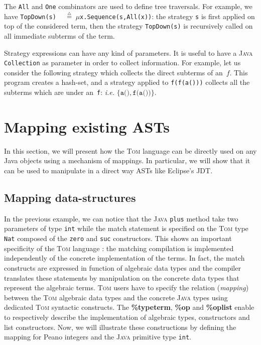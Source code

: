 \documentclass[runningheads]{llncs}
\newcommand{\tom}{\textsc{Tom}}
\newcommand{\java}{\textsc{Java}}
\newcommand{\lex}[1]{{\textrm{\textbf{#1}}}}
\newcommand{\isdef}{\mathrel{\mbox{\small$\stackrel{\mbox{\tiny$\triangle$}}{=}$}}}
\newcommand{\Mu}{{\ensuremath{\mu}}}
\newcommand{\ie}{\textit{i.e.}}
\begin{document}
The \texttt{All} and \texttt{One} combinators are used to define tree
traversals. For example, we have
\texttt{TopDown(s)}~${\isdef}$~$\Mu$\texttt{x.Sequence(s,All(x))}:
the strategy
 \texttt{s} is first applied on top of the considered term, then
the strategy \texttt{TopDown(s)} is recursively called on all immediate
subterms of the term.

Strategy expressions can have any kind of parameters. It is useful to have a
{\java} \texttt{Collection} as parameter in order to collect information.  For
example, let us consider the following strategy which collects the direct
subterms of an~$f$.  This program creates a hash-set, and a strategy applied to
\texttt{f(f(a()))} collects all the subterms which are under an~\texttt{f}:
{\ie} $\{\texttt{a()}, \texttt{f(a())}\}$.


\section{Mapping existing ASTs}

In this section, we will present how the {\tom} language can be directly used
on any Java objects using a mechanism of mappings. In particular, we will show
that it can be used to manipulate in a direct way ASTs like Eclipse's JDT.


\subsection{Mapping data-structures}

In the previous example, we can notice that the {\java} \texttt{plus} method
take two parameters of type \texttt{int} while the match statement is specified
on the {\tom} type \texttt{Nat} composed of the \texttt{zero} and \texttt{suc}
constructors. This shows an important specificity of the {\tom} language : the
matching compilation is implemented independently of the concrete
implementation of the terms. In fact, the match constructs are expressed in
function of algebraic data types and the compiler translates these statements
by manipulation on the concrete data types that represent the algebraic terms.
{\tom} users have to specify the relation (\emph{mapping}) between the {\tom}
algebraic data types and the concrete {\java} types using dedicated {\tom}
syntactic constructs. The \lex{\%typeterm}, \lex{\%op} and \lex{\%oplist}
enable to respectively  describe the implementation of algebraic types,
constructors and list constructors. Now, we will illustrate these constructions
by defining the mapping for Peano integers and the {\java} primitive type
\texttt{int}.
\end{document}
